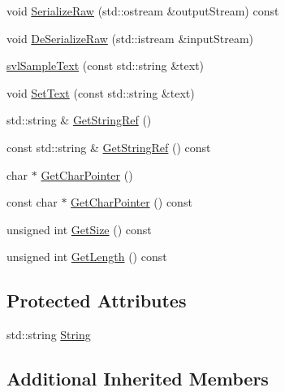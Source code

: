 \begin{DoxyCompactItemize}
\item 
void \hyperlink{classsvl_sample_text_a477440c4692d1e273517182a357194fa}{Serialize\-Raw} (std\-::ostream \&output\-Stream) const 
\item 
void \hyperlink{classsvl_sample_text_a47c1fb6879865f5036169fb821d4953c}{De\-Serialize\-Raw} (std\-::istream \&input\-Stream)
\item 
\hyperlink{classsvl_sample_text_afd138ae89a26579534a74b756f2fbf55}{svl\-Sample\-Text} (const std\-::string \&text)
\item 
void \hyperlink{classsvl_sample_text_aae2e951cb26cb00efd734e500bd72854}{Set\-Text} (const std\-::string \&text)
\item 
std\-::string \& \hyperlink{classsvl_sample_text_a4d65efeaa8c5e134798d1d1a4d78a100}{Get\-String\-Ref} ()
\item 
const std\-::string \& \hyperlink{classsvl_sample_text_a00b1c821b851248db6b27818d4171c24}{Get\-String\-Ref} () const 
\item 
char $\ast$ \hyperlink{classsvl_sample_text_acf83eb3b85222acded478d10c2c7bf4f}{Get\-Char\-Pointer} ()
\item 
const char $\ast$ \hyperlink{classsvl_sample_text_a370564e67fb7068bf48650ffab7d8fcf}{Get\-Char\-Pointer} () const 
\item 
unsigned int \hyperlink{classsvl_sample_text_a9aa86da7d78065949de0c8dbeb29903c}{Get\-Size} () const 
\item 
unsigned int \hyperlink{classsvl_sample_text_a724aa4b3005bc79c0850d103254b8686}{Get\-Length} () const 
\end{DoxyCompactItemize}
\subsection*{Protected Attributes}
\begin{DoxyCompactItemize}
\item 
std\-::string \hyperlink{classsvl_sample_text_a4310fa0f9bcd891a5cae8aa91754171d}{String}
\end{DoxyCompactItemize}
\subsection*{Additional Inherited Members}


